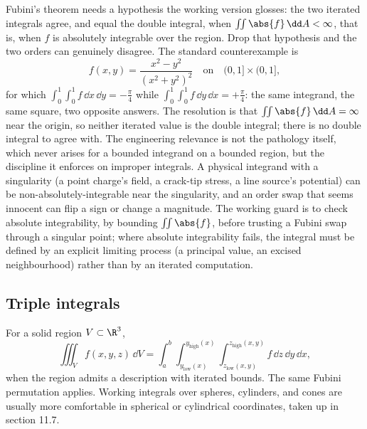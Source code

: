 \begin{mastery}
Fubini's theorem needs a hypothesis the working version glosses: the
two iterated integrals agree, and equal the double integral, when
$\iint\abs{f}\,\dd A < \infty$, that is, when $f$ is absolutely
integrable over the region. Drop that hypothesis and the two orders can
genuinely disagree. The standard counterexample is
\[
f(x, y) = \frac{x^{2} - y^{2}}{(x^{2} + y^{2})^{2}}
\quad\text{on}\quad (0, 1]\times(0, 1],
\]
for which $\int_{0}^{1}\!\int_{0}^{1} f\,\dd x\,\dd y = -\tfrac{\pi}{4}$
while $\int_{0}^{1}\!\int_{0}^{1} f\,\dd y\,\dd x = +\tfrac{\pi}{4}$: the
same integrand, the same square, two opposite answers. The resolution is
that $\iint\abs{f}\,\dd A = \infty$ near the origin, so neither iterated
value is the double integral; there is no double integral to agree with.
The engineering relevance is not the pathology itself, which never
arises for a bounded integrand on a bounded region, but the discipline
it enforces on improper integrals. A physical integrand with a
singularity (a point charge's field, a crack-tip stress, a line source's
potential) can be non-absolutely-integrable near the singularity, and an
order swap that seems innocent can flip a sign or change a magnitude. The
working guard is to check absolute integrability, by bounding
$\iint\abs{f}$, before trusting a Fubini swap through a singular point;
where absolute integrability fails, the integral must be defined by an
explicit limiting process (a principal value, an excised
neighbourhood) rather than by an iterated computation.
\end{mastery}

\subsection{Triple integrals}

For a solid region $V \subset \R^{3}$,
\[
\iiint_{V} f(x, y, z) \,\dd V = \int_{a}^{b}\!\int_{y_{\text{low}}(x)}
^{y_{\text{high}}(x)}\!\int_{z_{\text{low}}(x, y)}^{z_{\text{high}}
(x, y)} f \,\dd z\,\dd y\,\dd x,
\]
when the region admits a description with iterated bounds.
The same Fubini permutation applies. Working integrals over
spheres, cylinders, and cones are usually more comfortable in
spherical or cylindrical coordinates, taken up in section 11.7.

